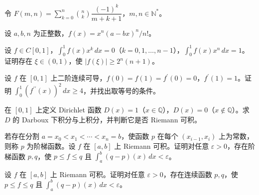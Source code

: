 \noindent\begin{minipage}{\textwidth}
令 $F(m,n)=\sum_{k=0}^n\binom nk\dfrac{(-1)^k}{m+k+1}$，$m,n\in\mathbb N^*$。
\end{minipage}\par\vfill
\noindent\begin{minipage}{\textwidth}
设 $a,b,n$ 为正整数，$f(x)=x^n(a-bx)^n/n!$。
\end{minipage}\par\vfill
\newpage
\noindent\begin{minipage}{\textwidth}
设 $f\in C[0,1]$，$\int_0^1f(x)x^k\,dx=0$（$k=0,1,\ldots,n-1$），$\int_0^1f(x)x^n\,dx=1$。证明存在 $\xi\in(0,1)$，使 $|f(\xi)|\ge2^n(n+1)$。
\end{minipage}\par\vfill
\noindent\begin{minipage}{\textwidth}
设 $f$ 在 $[0,1]$ 上二阶连续可导，$f(0)=f(1)=f^{\prime}(0)=0$，$f^{\prime}(1)=1$。证明 $\int_0^1(f^{\prime\prime}(x))^2\,dx\ge4$，并找出取等号的条件。
\end{minipage}\par\vfill
\noindent\begin{minipage}{\textwidth}
在 $[0,1]$ 上定义 Dirichlet 函数 $D(x)=1$（$x\in\mathbb Q$），$D(x)=0$（$x\notin\mathbb Q$）。求 $D$ 的 Darboux 下积分与上积分，并判断它是否 Riemann 可积。
\end{minipage}\par\vfill
\newpage
\noindent\begin{minipage}{\textwidth}
若存在分割 $a=x_0<x_1<\cdots<x_n=b$，使函数 $p$ 在每个 $(x_{i-1},x_i)$ 上为常数，则称 $p$ 为阶梯函数。设 $f$ 在 $[a,b]$ 上 Riemann 可积。证明对任意 $\varepsilon>0$，存在阶梯函数 $p,q$，使 $p\le f\le q$ 且 $\int_a^b(q-p)(x)\,dx<\varepsilon$。
\end{minipage}\par\vfill
\noindent\begin{minipage}{\textwidth}
设 $f$ 在 $[a,b]$ 上 Riemann 可积。证明对任意 $\varepsilon>0$，存在连续函数 $p,q$，使 $p\le f\le q$ 且 $\int_a^b(q-p)(x)\,dx<\varepsilon$。
\end{minipage}\par\vfill
